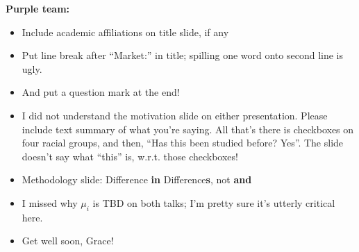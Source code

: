 \documentclass[12pt,pdftex,letterpaper]{article}
\begin{document}
\vspace{0.5cm}

\noindent \textbf{Purple team:}
\begin{itemize}
	\item Include academic affiliations on title slide, if any
	
	\item Put line break after ``Market:'' in title; spilling one word onto second line is ugly.
	
	\item And put a question mark at the end!
	
	\item I did not understand the motivation slide on either presentation. Please include text summary of what you're saying. All that's there is checkboxes on four racial groups, and then, ``Has this been studied before? Yes''.  The slide doesn't say what ``this'' is, w.r.t. those checkboxes!
	
	\item Methodology slide: Difference \textbf{in} Difference\textbf{s}, not \textbf{and}
	
	\item I missed why $\mu_i$ is TBD on both talks; I'm pretty sure it's utterly critical here.
	
	\item Get well soon, Grace!
\end{itemize}

\vspace{0.5cm}
\end{document}
